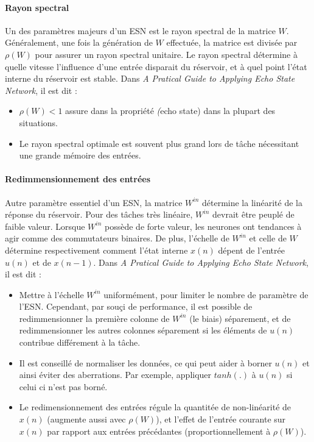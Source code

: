 \documentclass[12pt]{article}
\begin{document}
\paragraph{Rayon spectral}
Un des paramètres majeurs d'un ESN est le rayon spectral de la matrice $W$. Généralement, une fois la génération de $W$ effectuée, la matrice est divisée par $\rho(W)$ pour assurer un rayon spectral unitaire. Le rayon spectral détermine à quelle vitesse l'influence d'une entrée disparait du réservoir, et à quel point l'état interne du réservoir est stable.\newline
Dans \textit{A Pratical Guide to Applying Echo State Network}, il est dit :
\begin{itemize}
\item $\rho(W) < 1$ assure dans la propriété \textit(echo state) dans la plupart des situations.
\item Le rayon spectral optimale est souvent plus grand lors de tâche nécessitant une grande mémoire des entrées.
\end{itemize}

\paragraph{Redimmensionnement des entrées}
Autre paramètre essentiel d'un ESN, la matrice $W^{in}$ détermine la linéarité de la réponse du réservoir. Pour des tâches très linéaire, $W^{in}$ devrait être peuplé de faible valeur. Lorsque $W^{in}$ possède de forte valeur, les neurones ont tendances à agir comme des commutateurs binaires. De plus, l'échelle de $W^{in}$ et celle de $W$ détermine respectivement comment l'état interne $x(n)$ dépent de l'entrée $u(n)$ et de $x(n-1)$.\newline
Dans \textit{A Pratical Guide to Applying Echo State Network}, il est dit :
\begin{itemize}
\item Mettre à l'échelle $W^{in}$ uniformément, pour limiter le nombre de paramètre de l'ESN. Cependant, par souçi de performance, il est possible de redimmensionner la première colonne de $W^{in}$ (le biais) séparement, et de redimmensionner les autres colonnes séparement si les éléments de $u(n)$ contribue différement à la tâche.
\item Il est conseillé de normaliser les données, ce qui peut aider à borner $u(n)$ et ainsi éviter des aberrations. Par exemple, appliquer $tanh(.)$ à $u(n)$ si celui ci n'est pas borné.
\item Le redimensionnement des entrées régule la quantitée de non-linéarité de $x(n)$ (augmente aussi avec $\rho(W)$), et l'effet de l'entrée courante sur $x(n)$ par rapport aux entrées précédantes (proportionnellement à $\rho(W)$).
\end{itemize}
\end{document}
